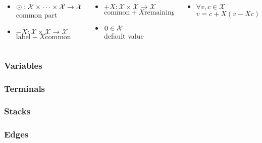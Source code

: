 \documentclass[english]{beamer}
\begin{document}
\begin{frame}
\begin{columns}
    \begin{column}{.35\textwidth}
      \begin{itemize}
        \item $\common{X} : \mathcal{X} \times \dots \times \mathcal{X} \rightarrow \mathcal{X}$ \\
          common part
        \item
          $\minus{X} : \mathcal{X} \times \mathcal{X} \rightarrow \mathcal{X}$ \\
          $\text{label} \minus{X} \text{common}$
      \end{itemize}
    \end{column}
    \begin{column}{.35\textwidth}
      \begin{itemize}
        \item
          $\plus{X} : \mathcal{X} \times \mathcal{X} \rightarrow \mathcal{X}$ \\
          $\text{common} \plus{X} \text{remaining}$
        \item $\zero{X} \in \mathcal{X}$ \\
          default value
      \end{itemize}
    \end{column}
    \begin{column}{.28\textwidth}
      \begin{itemize}
        \item $\forall v, c \in \mathcal{X}$ \\
          $v = c \plus{X} (v \minus{X} c)$
      \end{itemize}
    \end{column}
  \end{columns}
\end{frame}

\begin{frame}
  \frametitle{Variables}
\end{frame}

\begin{frame}
  \frametitle{Terminals}
\end{frame}

\begin{frame}
  \frametitle{Stacks}
\end{frame}

\begin{frame}
  \frametitle{Edges}
\end{frame}
\end{document}
